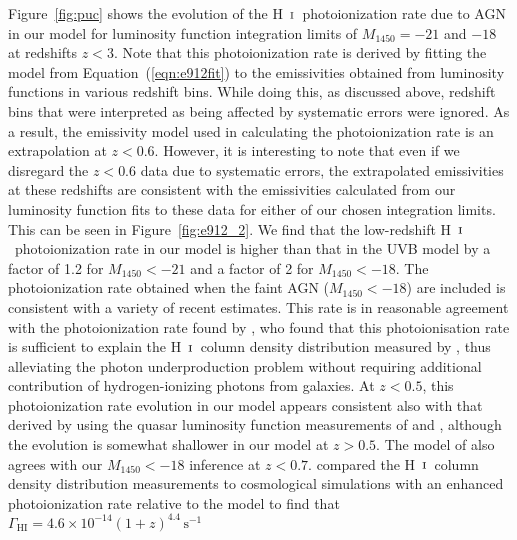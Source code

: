 \documentclass[fleqn,usenatbib]{mnras}
\def\HI{\hbox{H~$\scriptstyle\rm I$}}
\begin{document}
      Figure~\ref{fig:puc} shows the evolution of the \HI\ photoionization
      rate due to AGN in our model for luminosity function integration
      limits of $M_{1450}=-21$ and $-18$ at redshifts $z<3$.  Note that this
      photoionization rate is derived by fitting the model from
      Equation~(\ref{eqn:e912fit}) to the emissivities obtained from
      luminosity functions in various redshift bins.  While doing this, as
      discussed above, redshift bins that were interpreted as being affected
      by systematic errors were ignored.  As a result, the emissivity model
      used in calculating the photoionization rate is an extrapolation at
      $z<0.6$.  However, it is interesting to note that even if we disregard
      the $z<0.6$ data due to systematic errors, the extrapolated
      emissivities at these redshifts are consistent with the emissivities
      calculated from our luminosity function fits to these data for either
      of our chosen integration limits.  This can be seen in
      Figure~\ref{fig:e912_2}.  We find that the low-redshift
      \HI\ photoionization rate in our model is higher than that in the
      \citet{2012ApJ...746..125H} UVB model by a factor of 1.2 for
      $M_{1450}<-21$ and a factor of 2 for $M_{1450}<-18$.  The
      photoionization rate obtained when the faint AGN ($M_{1450}<-18$) are
      included is consistent with a variety of recent estimates.  This rate
      is in reasonable agreement with the photoionization rate found by
      \citet{2017MNRAS.467.3172G}, who found that this photoionisation rate
      is sufficient to explain the \HI\ column density distribution measured
      by \citet{2016ApJ...817..111D}, thus alleviating the photon
      underproduction problem without requiring additional contribution of
      hydrogen-ionizing photons from galaxies.  At $z<0.5$, this
      photoionization rate evolution in our model appears consistent also
      with that derived by \citet{2015MNRAS.451L..30K} using the quasar
      luminosity function measurements of \citet{2009MNRAS.392...19C} and
      \citet{2013A&A...551A..29P}, although the evolution is somewhat
      shallower in our model at $z>0.5$.  The model of
      \citet{2015ApJ...813L...8M} also agrees with our $M_{1450}<-18$
      inference at $z<0.7$.  \citet{2015ApJ...811....3S} compared the
      \HI\ column density distribution measurements to cosmological
      simulations with an enhanced photoionization rate relative to the
      \citet{2012ApJ...746..125H} model to find that
      $\Gamma_\mathrm{HI}=4.6\times 10^{-14}(1+z)^{4.4}\,\mathrm{s}^{-1}$
\end{document}
